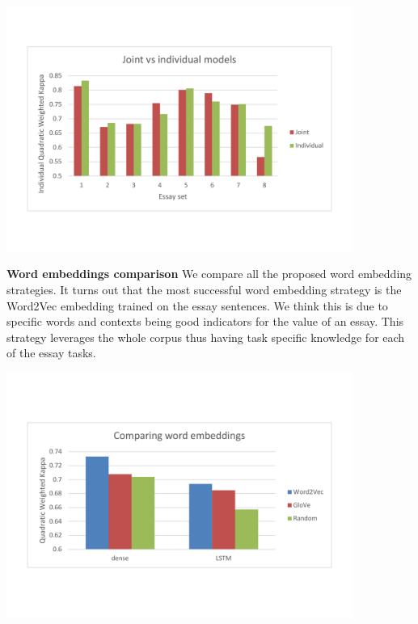 \documentclass[a4paper,12pt,english]{article}
\begin{document}
\begin{center}
\vspace*{-1.5cm}
\includegraphics[width=0.85\textwidth]{fig/joint_vs_indiv.pdf}
\vspace*{-1.5cm}
\end{center}

\textbf{Word embeddings comparison} We compare all the proposed word embedding strategies. It turns out that the most successful word embedding strategy is the Word2Vec embedding trained on the essay sentences. We think this is due to specific words and contexts being good indicators for the value of an essay. This strategy leverages the whole corpus thus having task specific knowledge for each of the essay tasks.

\begin{center}
\vspace*{-1.5cm}
\includegraphics[width=0.85\textwidth]{fig/word_embeddings.pdf}
\vspace*{-1.5cm}
\end{center}
\end{document}
